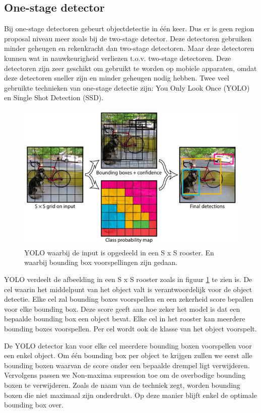 \subsection{One-stage detector}
Bij one-stage detectoren gebeurt objectdetectie in \'e\'en keer. 
Dus er is geen region proposal niveau meer zoals bij de two-stage detector. 
Deze detectoren gebruiken minder geheugen en rekenkracht dan two-stage detectoren.
Maar deze detectoren kunnen wat in nauwkeurigheid verliezen t.o.v. two-stage detectoren.
Deze detectoren zijn zeer geschikt om gebruikt te worden op mobiele apparaten, omdat deze detectoren sneller zijn en minder geheugen nodig hebben.
Twee veel gebruikte technieken van one-stage detectie zijn: You Only Look Once (YOLO) en Single Shot Detection (SSD).

\begin{figure}[!ht]
	\centering
	\includegraphics[width=0.60\linewidth]{fig/YOLO.jpg}
	\caption{YOLO waarbij de input is opgedeeld in een S x S rooster. 
	En waarbij bounding box voorspellingen zijn gedaan.}
	\label{fig:yolo}
\end{figure}

YOLO \cite{redmon_you_2016} verdeelt de afbeelding in een S x S rooster zoals in figuur \ref{fig:yolo} te zien is. 
De cel waarin het middelpunt van het object valt is verantwoordelijk voor de object detectie.
Elke cel zal bounding boxes voorspellen en een zekerheid score bepallen voor elke bounding box. 
Deze score geeft aan hoe zeker het model is dat een bepaalde bounding box een object bevat.
Elke cel in het rooster kan meerdere bounding boxes voorspellen.
Per cel wordt ook de klasse van het object voorspelt.

De YOLO detector kan voor elke cel meerdere bounding boxen voorspellen voor een enkel object.
Om \'e\'en bounding box per object te krijgen zullen we eerst alle bounding boxen waarvan de score onder een bepaalde drempel ligt verwijderen.
Vervolgens passen we Non-maxima supression toe om de overbodige bounding boxen te verwijderen. 
Zoals de naam van de techniek zegt, worden bounding boxen die niet maximaal zijn onderdrukt.
Op deze manier blijft enkel de optimale bounding box over.

